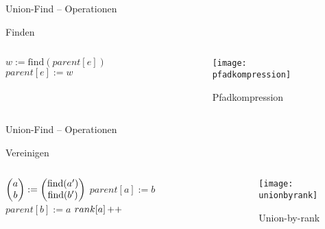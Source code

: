 \begin{frame}{Union-Find – Operationen}
	\begin{exampleblock}{Finden}
		\begin{columns}[T] 
			\begin{column}[T]{.5\linewidth} 
				\begin{algorithm}[H]
					 {
						 {
							\;
						} {
							$w := \text{find}(parent[e])$\;
							 \;
							$parent[e] := w$\;
							\;
						}
					}
				\end{algorithm}
			\end{column}
			\begin{column}[T]{.4\linewidth} 
				\bigskip
				\begin{figure}[b]
					\centering
					\texttt{[image: pfadkompression]}
					\caption{Pfadkompression}
				\end{figure}
			\end{column}
		\end{columns}
	\end{exampleblock}
\end{frame}

\begin{frame}{Union-Find – Operationen}
	\begin{exampleblock}{Vereinigen}
		\begin{columns}[T] 
			\begin{column}[T]{.5\linewidth} 
				\begin{algorithm}[H]
	
					 {
						$\begin{pmatrix} a \\ b \end{pmatrix} := \begin{pmatrix} \text{find}(a') \\ \text{find}(b') \end{pmatrix}$ \;
						 {
							 \;
							 {
								$parent[a] := b$\;
							} {
								$parent[b] := a$\;
								 {
									$rank[a]\operatorname{++}$\;
								}
							}
						}
					}
				\end{algorithm}
			\end{column}
			\begin{column}[T]{.4\linewidth} 
				\vspace{5\bigskipamount}
				\begin{figure}[b]
					\centering
					\texttt{[image: unionbyrank]}
					\caption{Union-by-rank}
				\end{figure}
			\end{column}
		\end{columns}
	\end{exampleblock}
\end{frame}


